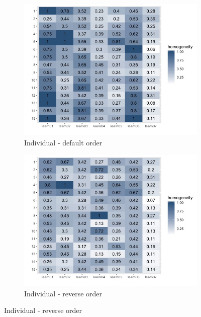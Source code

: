 \documentclass{article}
\begin{document}
\begin{figure}[h!]
  \centering
  \begin{subfigure}[t]{0.45\textwidth}
    \centering
    \includegraphics[width=\linewidth]{var_ind} 
    \caption{Individual - default order}
  \end{subfigure}
  \begin{subfigure}[t]{0.45\textwidth}
    \centering
    \includegraphics[width=\linewidth]{var_rev_ind} 
    \caption{Individual - reverse order}
  \end{subfigure}


\end{figure}
\end{document}
